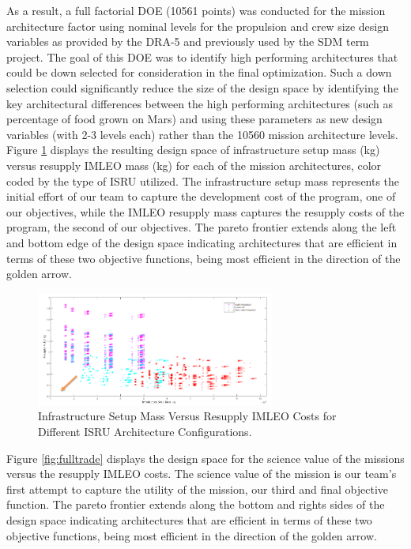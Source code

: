 \documentclass[]{aiaa-pretty}
\begin{document}
As a result, a full factorial DOE (10561 points) was conducted for the mission architecture factor using nominal levels for the propulsion and crew size design variables as provided by the DRA-5 and previously used by the SDM term project. The goal of this DOE was to identify high performing architectures that could be down selected for consideration in the final optimization. Such a down selection could significantly reduce the size of the design space by identifying the key architectural differences between the high performing architectures (such as percentage of food grown on Mars) and using these parameters as new design variables (with 2-3 levels each) rather than the 10560 mission architecture levels. Figure \ref{fig:infratrade} displays the resulting design space of infrastructure setup mass (kg) versus resupply IMLEO mass (kg) for each of the mission architectures, color coded by the type of ISRU utilized. The infrastructure setup mass represents the initial effort of our team to capture the development cost of the program, one of our objectives, while the IMLEO resupply mass captures the resupply costs of the program, the second of our objectives. The pareto frontier extends along the left and bottom edge of the design space indicating architectures that are efficient in terms of these two objective functions, being most efficient in the direction of the golden arrow.

\begin{figure}[h!]
	\centering
	\includegraphics[width=0.7\textwidth]{InfraTrade}  %
	\caption{Infrastructure Setup Mass Versus Resupply IMLEO Costs for Different ISRU Architecture Configurations.}
	\label{fig:infratrade}
\end{figure}

Figure \ref{fig:fulltrade} displays the design space for the science value of the missions versus the resupply IMLEO costs. The science value of the mission is our team’s first attempt to capture the utility of the mission, our third and final objective function. The pareto frontier extends along the bottom and rights sides of the design space indicating architectures that are efficient in terms of these two objective functions, being most efficient in the direction of the golden arrow.
\end{document}
